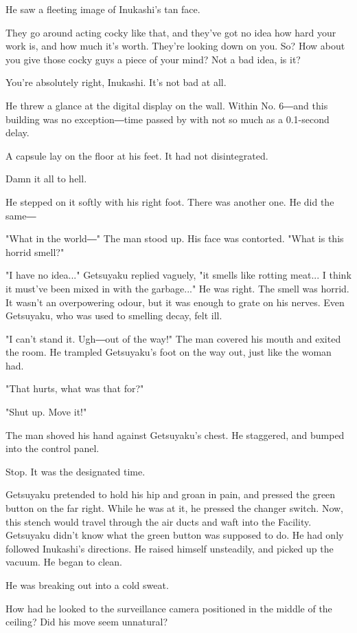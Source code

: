 He saw a fleeting image of Inukashi's tan face.

They go around acting cocky like that, and they've got no idea how hard
your work is, and how much it's worth. They're looking down on you. So?
How about you give those cocky guys a piece of your mind? Not a bad
idea, is it?

You're absolutely right, Inukashi. It's not bad at all.

He threw a glance at the digital display on the wall. Within No. 6―and
this building was no exception―time passed by with not so much as a
0.1-second delay.

A capsule lay on the floor at his feet. It had not disintegrated.

Damn it all to hell.

He stepped on it softly with his right foot. There was another one. He
did the same―

"What in the world―" The man stood up. His face was contorted. "What is
this horrid smell?"

"I have no idea..." Getsuyaku replied vaguely, "it smells like rotting
meat... I think it must've been mixed in with the garbage..." He was
right. The smell was horrid. It wasn't an overpowering odour, but it was
enough to grate on his nerves. Even Getsuyaku, who was used to smelling
decay, felt ill.

"I can't stand it. Ugh―out of the way!" The man covered his mouth and
exited the room. He trampled Getsuyaku's foot on the way out, just like
the woman had.

"That hurts, what was that for?"

"Shut up. Move it!"

The man shoved his hand against Getsuyaku's chest. He staggered, and
bumped into the control panel.

Stop. It was the designated time.

Getsuyaku pretended to hold his hip and groan in pain, and pressed the
green button on the far right. While he was at it, he pressed the
changer switch. Now, this stench would travel through the air ducts and
waft into the Facility. Getsuyaku didn't know what the green button was
supposed to do. He had only followed Inukashi's directions. He raised
himself unsteadily, and picked up the vacuum. He began to clean.

He was breaking out into a cold sweat.

How had he looked to the surveillance camera positioned in the middle of
the ceiling? Did his move seem unnatural?

